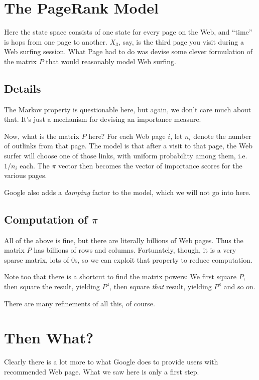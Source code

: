 \section{The PageRank Model}

Here the state space consists of one state for every page on the Web,
and ``time'' is hops from one page to another.  $X_3$, say, is the third
page you visit during a Web surfing session.  What Page had to do was
devise some clever formulation of the matrix $P$ that would reasonably
model Web surfing.

\subsection{Details}

The Markov property is questionable here, but again, we don't care much
about that.  It's just a mechanism for devising an importance measure.

Now, what is the matrix $P$ here?  For each Web page $i$, let $n_i$
denote the number of outlinks from that page.  The model is that after a
visit to that page, the Web surfer will choose one of those links, with
uniform probability among them, i.e.\ $1/n_i$ each.  The $\pi$ vector
then becomes the vector of importance scores for the various pages.

Google also adds a \textit{damping} factor to the model, which we will
not go into here.

\subsection{Computation of $\pi$}

All of the above is fine, but there are literally billions of Web pages.
Thus the matrix $P$ has billions of rows and columns.  Fortunately,
though, it is a very sparse matrix, lots of 0s, so we can exploit that
property to reduce computation.  

Note too that there is a shortcut to find the matrix powers:  We first
square $P$, then square the result, yielding $P^4$, then square
\textit{that} result, yielding $P^8$ and so on.

There are many refinements of all this, of course.

\section{Then What?}

Clearly there is a lot more to what Google does to provide users with
recommended Web page.  What we saw here is only a first step.
